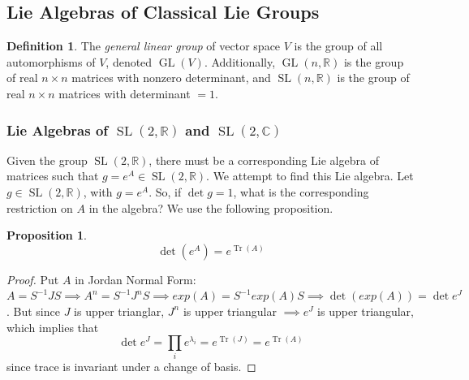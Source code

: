 \documentclass{article}
\DeclareMathOperator{\Tr}{Tr}
\DeclareMathOperator{\GL}{GL}
\DeclareMathOperator{\SL}{SL}
\newtheorem{proposition}[theorem]{Proposition}
\theoremstyle{remark}
\theoremstyle{definition}
\newtheorem{definition}{Definition}[section]
\begin{document}
\subsection{Lie Algebras of Classical Lie Groups}

\begin{definition}
The \textit{general linear group} of vector space $V$ is the group of all automorphisms of $V$, denoted $\GL(V)$. Additionally, $\GL(n, \mathbb{R})$ is the group of real $n \times n$ matrices with nonzero determinant, and $\SL(n, \mathbb{R})$ is the group of real $n \times n$ matrices with determinant $= 1$.
\end{definition}

\subsubsection[Lie Algebras of SL(2, R) and SL(2, C)]{Lie Algebras of $\SL(2, \mathbb{R})$ and $\SL(2, \mathbb{C})$}
Given the group $\SL(2, \mathbb{R})$, there must be a corresponding Lie algebra of matrices such that $g = e^A \in \SL(2, \mathbb{R})$. We attempt to find this Lie algebra. Let $g \in \SL(2, \mathbb{R})$, with $g = e^A$. So, if $\det{g} = 1$, what is the corresponding restriction on $A$ in the algebra? We use the following proposition. 

\begin{proposition}
\[\det{(e^A)} = e^{\Tr{(A)}}\]
\end{proposition}
\begin{proof}
Put $A$ in Jordan Normal Form: $A = S^{-1} J S \implies A^n = S^{-1} J^n S \implies exp(A) = S^{-1} exp(A) S \implies \det{(exp(A))} = \det{e^J}$. But since $J$ is upper trianglar, $J^n$ is upper triangular $\implies e^J$ is upper triangular, which implies that 
\[\det{e^J} = \prod_i e^{\lambda_i} = e^{\Tr{(J)}} = e^{\Tr{(A)}}\]
since trace is invariant under a change of basis. 
\end{proof}
\end{document}
